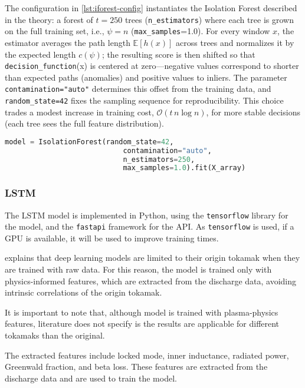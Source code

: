 The configuration in \autoref{lst:iforest-config} instantiates the Isolation Forest described in the theory: a forest of $t=250$ trees (\texttt{n\_estimators}) where each tree is grown on the full training set, i.e., $\psi=n$ (\texttt{max\_samples}=1.0). For every window $x$, the estimator averages the path length $\mathbb{E}[h(x)]$ across trees and normalizes it by the expected length $c(\psi)$; the resulting score is then shifted so that \texttt{decision\_function}(x) is centered at zero—negative values correspond to shorter than expected paths (anomalies) and positive values to inliers. The parameter \texttt{contamination="auto"} determines this offset from the training data, and \texttt{random\_state=42} fixes the sampling sequence for reproducibility. This choice trades a modest increase in training cost, $\mathcal{O}(t\,n\log n)$, for more stable decisions (each tree sees the full feature distribution).

\begin{lstlisting}[language=Python, caption={Isolation Forest model configuration}, label={lst:iforest-config}]
    model = IsolationForest(random_state=42, 
                            contamination="auto",
                            n_estimators=250,
                            max_samples=1.0).fit(X_array)
\end{lstlisting}



\subsubsection{\acs{LSTM}}

The \ac{LSTM} model is implemented in Python, using the \texttt{tensorflow} library for the model, and the \texttt{fastapi} framework for the API. As \texttt{tensorflow} is used, if a \ac{GPU} is available, it will be used to improve training times.

\textcite[p.~2]{murariControlOrientedStrategy2024} explains that deep learning models are limited to their origin tokamak when they are trained with raw data. For this reason, the model is trained only with physics-informed features, which are extracted from the discharge data, avoiding intrinsic correlations of the origin tokamak.

It is important to note that, although model is trained with plasma-physics features, literature does not specify is the results are applicable for different tokamaks than the original.

The extracted features include locked mode, inner inductance, radiated power, Greenwald fraction, and beta loss. These features are extracted from the discharge data and are used to train the model. 


